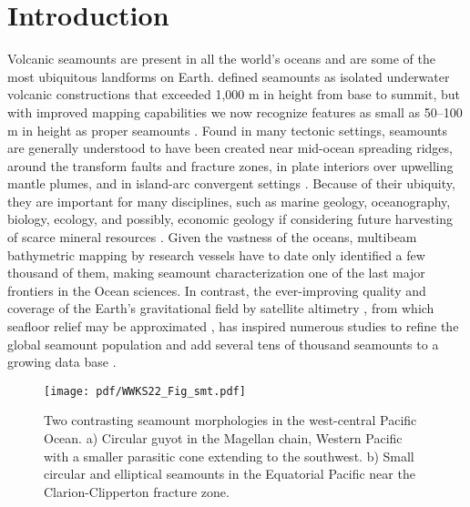 %

\section{Introduction}
Volcanic seamounts are present in all the world's oceans and are some of the most ubiquitous
landforms on Earth. \citet{M1964} defined seamounts as isolated underwater volcanic constructions
that exceeded 1,000 m in height from base to summit, but with improved mapping capabilities we now
recognize features as small as 50–100 m in height as proper seamounts \citep[e.g.,~][]{SC1990}.
Found in many tectonic settings, seamounts are generally understood to have been created near mid-ocean
spreading ridges, around the transform faults and fracture zones, in plate interiors over upwelling
mantle plumes, and in island-arc convergent settings
\citep[e.g.,~][]{SC2010}. Because of their ubiquity, they are important for many disciplines, such as
marine geology, oceanography, biology, ecology, and possibly, economic geology if considering future harvesting of
scarce mineral resources \citep[e.g.,~][]{WSK2010,WK2010}. Given the vastness of the oceans, multibeam bathymetric
mapping by research vessels have to date only identified a few thousand of them, making seamount
characterization one of the last major frontiers in the Ocean sciences. In contrast, the ever-improving
quality and coverage of the Earth's gravitational field by
satellite altimetry \citep[e.g.,~][]{Setal2021}, from which seafloor relief may be approximated
\citep{SS1997}, has inspired numerous studies to refine the global seamount population and add several
tens of thousand seamounts to a growing data base \citep{CS1988,WL1997,W2001,KL2004,KW2011,G2022}. 

\begin{figure}[h]
\centering
\noindent \texttt{[image: pdf/WWKS22\_Fig\_smt.pdf]}
\caption{Two contrasting seamount morphologies in the west-central Pacific Ocean. a) Circular guyot in the Magellan chain,
Western Pacific with a smaller parasitic cone extending to the southwest. b) Small circular and
elliptical seamounts in the Equatorial Pacific near the Clarion-Clipperton fracture zone.}
\label{WWKS22_Fig_sm}
\end{figure}

